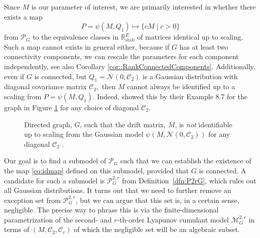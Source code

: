 \documentclass{biometrika}
\begin{document}
Since $M$ is our parameter of interest, we are primarily interested in whether there exists 
a map
\begin{equation}
    \label{eq:idmap}
    P = \psi(M, Q_1) \mapsto \{c M \mid c > 0\}
\end{equation}
from $\mathcal{P}_G$ to the equivalence classes in $\mathbb{R}^{E}_{\mathrm{stab}}$ of 
matrices identical up to scaling. Such a map cannot exists in general either, 
because if $G$ has at least two connectivity components, we can 
rescale the parameters for each component independently, see also Corollary \ref{cor::RankConnectedComponents}. Additionally, even if $G$ is connected, but 
$Q_1 = \mathcal{N}(0, \mathcal{C}_2)$ is a Gaussian distribution with diagonal 
covariance matrix $\mathcal{C}_2,$ then $M$ cannot always be identified up to 
a scaling from $P = \psi(M, Q_1)$. Indeed, \cite{Dettling:2023} showed this by their 
Example 8.7 for the graph in Figure \ref{fig::UnIDCov} for any choice of diagonal 
$\mathcal{C}_2$.


\begin{figure}
    \centering
\begin{center}
    \end{center}
    \caption{Directed graph, $G$, such that the drift matrix, $M$, is \emph{not} identifiable 
    up to scaling from the Gaussian model $\psi(M, \mathcal{N}(0, \mathcal{C}_2))$ for any
    diagonal $\mathcal{C}_2$ \citep{Dettling:2023}.}
    \label{fig::UnIDCov}
\end{figure}

Our goal is to find a submodel of $\mathcal{P}_G$ such that we can establish the existence 
of the map \eqref{eq:idmap} defined on this submodel, provided that $G$ is connected. 
A candidate for such a submodel is $\mathcal{P}^{2, r}_{G}$ from Definition~\ref{dfn:P2rG}, 
which rules out all Gaussian distributions. It turns out that we need to further remove 
an exception set from $\mathcal{P}^{2, r}_{G}$, but we can argue that this set is, 
in a certain sense, negligible. The precise way to phrase this is via the 
finite-dimensional parametrization of the second- and $r$-th-order Lyapunov cumulant model 
$\mathcal{M}^{2,r}_G$ in terms of $(M, \mathcal{C}_2, \mathcal{C}_r)$ of which the negligible set will be an algebraic subset. 
\end{document}
